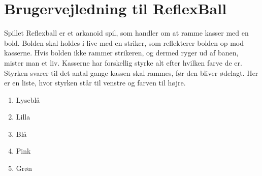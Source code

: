 \section{Brugervejledning til ReflexBall}
Spillet Reflexball er et arkanoid spil, som handler om at ramme kasser med en bold. Bolden skal holdes i live med en striker, som reflekterer bolden op mod kasserne. Hvis bolden ikke rammer strikeren, og dermed ryger ud af banen, mister man et liv. Kasserne har forskellig styrke alt efter hvilken farve de er. Styrken svarer til det antal gange kassen skal rammes, før den bliver ødelagt. Her er en liste, hvor styrken står til venstre og farven til højre.
\begin{enumerate}
\item Lyseblå
\item Lilla
\item Blå
\item Pink
\item Grøn
\end{enumerate}

